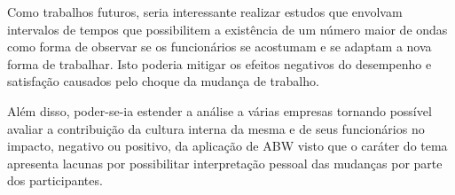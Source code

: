 \documentclass[kdmile,a4paper]{kdmile} %
\begin{document}
Como trabalhos futuros, seria interessante realizar  estudos que envolvam intervalos de tempos que possibilitem  a existência de um número maior de ondas como forma de observar se os funcionários se acostumam e se adaptam a nova forma de trabalhar. Isto poderia  mitigar os  efeitos negativos do desempenho e satisfação causados pelo choque da mudança de trabalho.

Além disso, poder-se-ia estender a análise a várias empresas tornando possível avaliar a contribuição da cultura interna da mesma e de seus funcionários no impacto, negativo ou positivo, da aplicação de ABW visto que o caráter do tema apresenta lacunas por possibilitar  interpretação pessoal das mudanças por parte dos participantes.
	



\begin{received}
\end{received}
\end{document}
